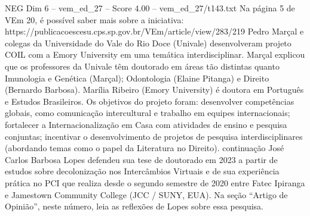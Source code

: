 \begin{textsample}{NEG Dim 6 – vem\_ed\_27 – Score 4.00 – vem\_ed\_27/t143.txt}
Na página 5 de VEm 20, é possível saber mais sobre a iniciativa: https://publicacoescesu.cps.sp.gov.br/VEm/article/view/283/219 Pedro Marçal e colegas da Universidade do Vale do Rio Doce (Univale) desenvolveram projeto COIL com a Emory University em uma temática interdisciplinar.
Marçal explicou que os professores da Univale têm doutorado em áreas tão distintas quanto Imunologia e Genética (Marçal); Odontologia (Elaine Pitanga) e Direito (Bernardo Barbosa).
Marília Ribeiro (Emory University) é doutora em Português e Estudos Brasileiros.
Os objetivos do projeto foram: desenvolver competências globais, como comunicação intercultural e trabalho em equipes internacionais; fortalecer a Internacionalização em Casa com atividades de ensino e pesquisa conjuntas; incentivar o desenvolvimento de projetos de pesquisa interdisciplinares (abordando temas como o papel da Literatura no Direito). continuação José Carlos Barbosa Lopes defendeu sua tese de doutorado em 2023 a partir de estudos sobre decolonização nos Intercâmbios Virtuais e de sua experiência prática no PCI que realiza desde o segundo semestre de 2020 entre Fatec Ipiranga e Jamestown Community College (JCC / SUNY, EUA).
Na seção “Artigo de Opinião”, neste número, leia as reflexões de Lopes sobre essa pesquisa.

\end{textsample}
